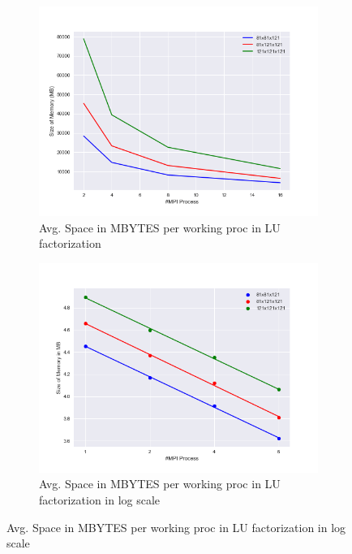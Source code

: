 \begin{figure}
\centering 
  \begin{subfigure}[b]{0.7\textwidth}
    \includegraphics[width=\textwidth]{images/memoryMescaMPI.png}
    \caption{Avg. Space in MBYTES per working proc in LU factorization}
    \label{sim2}
  \end{subfigure}
  \begin{subfigure}[b]{0.7\textwidth}
    \includegraphics[width=\textwidth]{images/MemoryMescaMPIlog.png}
    \caption{Avg. Space in MBYTES per working proc in LU factorization in log scale}
    \label{sim3}
  \end{subfigure}
\end{figure} 

